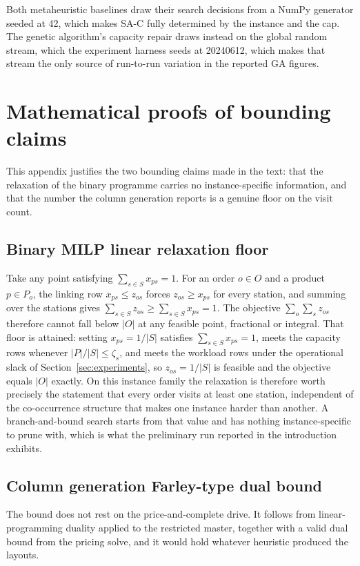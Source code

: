 \documentclass[]{interact}
\begin{document}
Both metaheuristic baselines draw their search decisions from a NumPy generator seeded at 42, which makes SA-C fully determined by the instance and the cap. The genetic algorithm's capacity repair draws instead on the global random stream, which the experiment harness seeds at 20240612, which makes that stream the only source of run-to-run variation in the reported GA figures.

\section{Mathematical proofs of bounding claims}\label{app:bounds}
This appendix justifies the two bounding claims made in the text: that the relaxation of the binary programme carries no instance-specific information, and that the number the column generation reports is a genuine floor on the visit count.

\subsection{Binary MILP linear relaxation floor}\label{app:bounds_milp} Take any point satisfying $\sum_{s\in S} x_{ps}=1$. For an order $o \in O$ and a product $p \in P_o$, the linking row $x_{ps}\le z_{os}$ forces $z_{os}\ge x_{ps}$ for every station, and summing over the stations gives $\sum_{s\in S} z_{os}\ge\sum_{s\in S} x_{ps}=1$. The objective $\sum_{o}\sum_{s} z_{os}$ therefore cannot fall below $|O|$ at any feasible point, fractional or integral. That floor is attained: setting $x_{ps}=1/|S|$ satisfies $\sum_{s\in S} x_{ps}=1$, meets the capacity rows whenever $|P|/|S|\le\zeta_s$, and meets the workload rows under the operational slack of Section~\ref{sec:experiments}, so $z_{os}=1/|S|$ is feasible and the objective equals $|O|$ exactly. On this instance family the relaxation is therefore worth precisely the statement that every order visits at least one station, independent of the co-occurrence structure that makes one instance harder than another. A branch-and-bound search starts from that value and has nothing instance-specific to prune with, which is what the preliminary run reported in the introduction exhibits.

\subsection{Column generation Farley-type dual bound}\label{app:bounds_cg} The bound does not rest on the price-and-complete drive. It follows from linear-programming duality applied to the restricted master, together with a valid dual bound from the pricing solve, and it would hold whatever heuristic produced the layouts.
\end{document}
